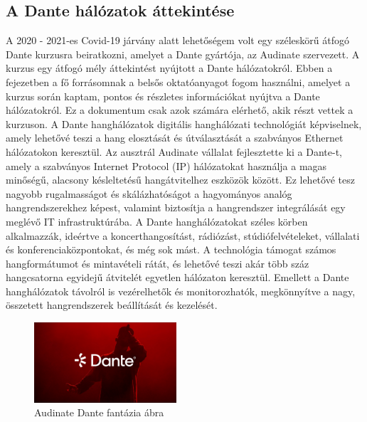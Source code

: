 \subsection{A Dante hálózatok áttekintése}
A 2020 - 2021-es Covid-19 járvány alatt lehetőségem volt egy széleskörű átfogó Dante
kurzusra beiratkozni, amelyet a Dante gyártója, az Audinate szervezett. A kurzus
egy átfogó mély áttekintést nyújtott a Dante hálózatokról. Ebben a fejezetben
a fő forrásomnak a belsős oktatóanyagot fogom használni, amelyet a kurzus
során kaptam, pontos és részletes információkat nyújtva a Dante hálózatokról.
Ez a dokumentum csak azok számára elérhető, akik részt vettek a kurzuson.
A Dante hanghálózatok digitális hanghálózati technológiát képviselnek, amely
lehetővé teszi a hang elosztását és útválasztását a szabványos Ethernet
hálózatokon keresztül. Az ausztrál Audinate vállalat fejlesztette ki a Dante-t,
amely a szabványos Internet Protocol (IP) hálózatokat használja a magas minőségű,
alacsony késleltetésű hangátvitelhez eszközök között. Ez lehetővé tesz
nagyobb rugalmasságot és skálázhatóságot a hagyományos analóg hangrendszerekhez
képest, valamint biztosítja a hangrendszer integrálását egy meglévő IT infrastruktúrába.
A Dante hanghálózatokat széles körben alkalmazzák, ideértve a koncerthangosítást,
rádiózást, stúdiófelvételeket, vállalati és konferenciaközpontokat, és még sok mást.
A technológia támogat számos hangformátumot és mintavételi rátát, és lehetővé
teszi akár több száz hangcsatorna egyidejű átvitelét egyetlen hálózaton keresztül.
Emellett a Dante hanghálózatok távolról is vezérelhetők és monitorozhatók,
megkönnyítve a nagy, összetett hangrendszerek beállítását és kezelését.
\begin{figure}[H]
	\centering
	\includegraphics[width=200px, keepaspectratio]{figures/dante_visual.jpg}
	\caption{Audinate Dante fantázia ábra}
	\label {fig:dante_visual}
\end{figure}


